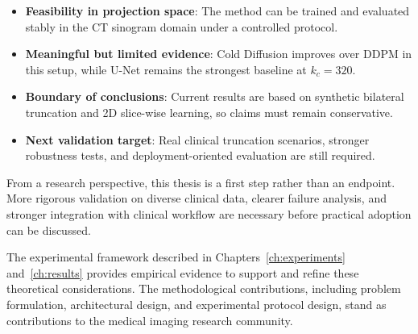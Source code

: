 \begin{itemize}
    \item \textbf{Feasibility in projection space}: The method can be trained and evaluated stably in the CT sinogram domain under a controlled protocol.
    \item \textbf{Meaningful but limited evidence}: Cold Diffusion improves over DDPM in this setup, while U-Net remains the strongest baseline at \(k_c=320\).
    \item \textbf{Boundary of conclusions}: Current results are based on synthetic bilateral truncation and 2D slice-wise learning, so claims must remain conservative.
    \item \textbf{Next validation target}: Real clinical truncation scenarios, stronger robustness tests, and deployment-oriented evaluation are still required.
\end{itemize}

From a research perspective, this thesis is a first step rather than an endpoint. More rigorous validation on diverse clinical data, clearer failure analysis, and stronger integration with clinical workflow are necessary before practical adoption can be discussed.

The experimental framework described in Chapters~\ref{ch:experiments} and~\ref{ch:results} provides empirical evidence to support and refine these theoretical considerations. The methodological contributions, including problem formulation, architectural design, and experimental protocol design, stand as contributions to the medical imaging research community.
